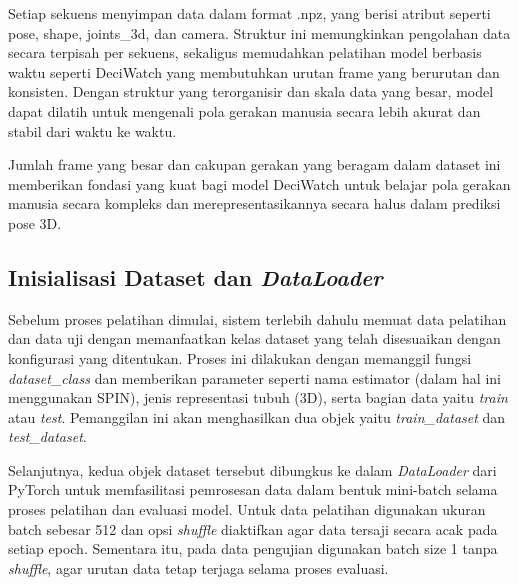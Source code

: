 Setiap sekuens menyimpan data dalam format {.npz}, yang berisi atribut seperti {pose}, {shape}, {joints\_3d}, dan {camera}. Struktur ini memungkinkan pengolahan data secara terpisah per sekuens, sekaligus memudahkan pelatihan model berbasis waktu seperti DeciWatch yang membutuhkan urutan frame yang berurutan dan konsisten. Dengan struktur yang terorganisir dan skala data yang besar, model dapat dilatih untuk mengenali pola gerakan manusia secara lebih akurat dan stabil dari waktu ke waktu.

Jumlah frame yang besar dan cakupan gerakan yang beragam dalam dataset ini memberikan fondasi yang kuat bagi model DeciWatch untuk belajar pola gerakan manusia secara kompleks dan merepresentasikannya secara halus dalam prediksi pose 3D.

\subsection{Inisialisasi Dataset dan \textit{DataLoader}}

Sebelum proses pelatihan dimulai, sistem terlebih dahulu memuat data pelatihan dan data uji dengan memanfaatkan kelas dataset yang telah disesuaikan dengan konfigurasi yang ditentukan. Proses ini dilakukan dengan memanggil fungsi \textit{dataset\_class} dan memberikan parameter seperti nama estimator (dalam hal ini menggunakan SPIN), jenis representasi tubuh (3D), serta bagian data yaitu \textit{train} atau \textit{test}. Pemanggilan ini akan menghasilkan dua objek yaitu \textit{train\_dataset} dan \textit{test\_dataset}.

Selanjutnya, kedua objek dataset tersebut dibungkus ke dalam \textit{DataLoader} dari PyTorch untuk memfasilitasi pemrosesan data dalam bentuk mini-batch selama proses pelatihan dan evaluasi model. Untuk data pelatihan digunakan ukuran batch sebesar 512 dan opsi \textit{shuffle} diaktifkan agar data tersaji secara acak pada setiap epoch. Sementara itu, pada data pengujian digunakan batch size 1 tanpa \textit{shuffle}, agar urutan data tetap terjaga selama proses evaluasi.


